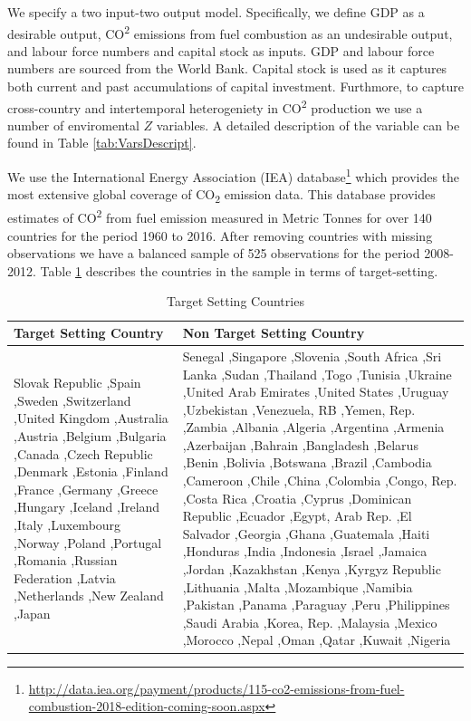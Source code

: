 \documentclass[12pt,]{article}
\begin{document}
We specify a two input-two output model. Specifically, we define GDP as a desirable output, CO\textsuperscript{2} emissions from fuel combustion as an undesirable output, and labour force numbers and capital stock as inputs. GDP and labour force numbers are sourced from the World Bank. Capital stock is used as it captures both current and past accumulations of capital investment. Furthmore, to capture cross-country and intertemporal heterogeniety in CO\textsuperscript{2} production we use a number of enviromental \(Z\) variables. A detailed description of the variable can be found in Table \ref{tab:VarsDescript}.

We use the International Energy Association (IEA) database\footnote{\url{http://data.iea.org/payment/products/115-co2-emissions-from-fuel-combustion-2018-edition-coming-soon.aspx}} which provides the most extensive global coverage of CO\textsubscript{2} emission data. This database provides estimates of CO\textsuperscript{2} from fuel emission measured in Metric Tonnes for over 140 countries for the period 1960 to 2016. After removing countries with missing observations we have a balanced sample of 525 observations for the period 2008-2012. Table \ref{tab:targetSetters} describes the countries in the sample in terms of target-setting.

\begin{table}[H]

\caption{\label{tab:targetSetters}Target Setting Countries}
\centering
\fontsize{10}{12}\selectfont
\begin{tabular}[t]{>{\raggedright\arraybackslash}p{20em}>{\raggedright\arraybackslash}p{20em}}
\toprule
Target Setting Country & Non Target Setting Country\\
\midrule
Slovak Republic ,Spain ,Sweden ,Switzerland ,United Kingdom ,Australia ,Austria ,Belgium ,Bulgaria ,Canada ,Czech Republic ,Denmark ,Estonia ,Finland ,France ,Germany ,Greece ,Hungary ,Iceland ,Ireland ,Italy ,Luxembourg ,Norway ,Poland ,Portugal ,Romania ,Russian Federation ,Latvia ,Netherlands ,New Zealand ,Japan & Senegal ,Singapore ,Slovenia ,South Africa ,Sri Lanka ,Sudan ,Thailand ,Togo ,Tunisia ,Ukraine ,United Arab Emirates ,United States ,Uruguay ,Uzbekistan ,Venezuela, RB ,Yemen, Rep. ,Zambia ,Albania ,Algeria ,Argentina ,Armenia ,Azerbaijan ,Bahrain ,Bangladesh ,Belarus ,Benin ,Bolivia ,Botswana ,Brazil ,Cambodia ,Cameroon ,Chile ,China ,Colombia ,Congo, Rep. ,Costa Rica ,Croatia ,Cyprus ,Dominican Republic ,Ecuador ,Egypt, Arab Rep. ,El Salvador ,Georgia ,Ghana ,Guatemala ,Haiti ,Honduras ,India ,Indonesia ,Israel ,Jamaica ,Jordan ,Kazakhstan ,Kenya ,Kyrgyz Republic ,Lithuania ,Malta ,Mozambique ,Namibia ,Pakistan ,Panama ,Paraguay ,Peru ,Philippines ,Saudi Arabia ,Korea, Rep. ,Malaysia ,Mexico ,Morocco ,Nepal ,Oman ,Qatar ,Kuwait ,Nigeria\\
\bottomrule
\end{tabular}
\end{table}
\end{document}
